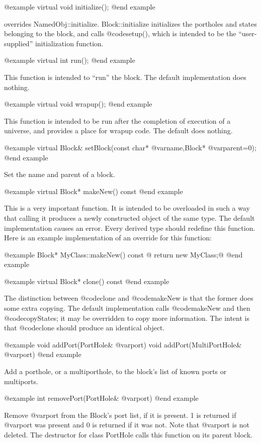 @example
virtual void initialize();
@end example

overrides NamedObj::initialize.  Block::initialize initializes the
portholes and states belonging to the block, and calls @code{setup()}, which
is intended to be the ``user-supplied'' initialization function.

@example
virtual int run();
@end example

This function is intended to ``run'' the block.  The default
implementation does nothing.

@example
virtual void wrapup();
@end example

This function is intended to be run after the completion of execution
of a universe, and provides a place for wrapup code.  The default does
nothing.

@example
virtual Block& setBlock(const char* @var{name},Block* @var{parent}=0);
@end example

Set the name and parent of a block.

@example
virtual Block* makeNew() const
@end example

This is a very important function.  It is intended to be overloaded in
such a way that calling it produces a newly constructed object of the
same type.  The default implementation causes an error.  Every derived
type should redefine this function.  Here is an example implementation
of an override for this function:

@example
Block* MyClass::makeNew() const @{ return new MyClass;@}
@end example

@example
virtual Block* clone() const
@end example

The distinction between @code{clone} and @code{makeNew} is that the
former does some extra copying.  The default implementation calls
@code{makeNew} and then @code{copyStates}; it may be overridden to
copy more information.  The intent is that @code{clone} should produce
an identical object.

@example
void addPort(PortHole& @var{port})
void addPort(MultiPortHole& @var{port})
@end example

Add a porthole, or a multiporthole, to the block's list of known ports
or multiports.

@example
int removePort(PortHole& @var{port})
@end example

Remove @var{port} from the Block's port list, if it is present.
1 is returned if @var{port} was present and 0 is returned if it
was not.  Note that @var{port} is not deleted.  The destructor
for class PortHole calls this function on its parent block.

